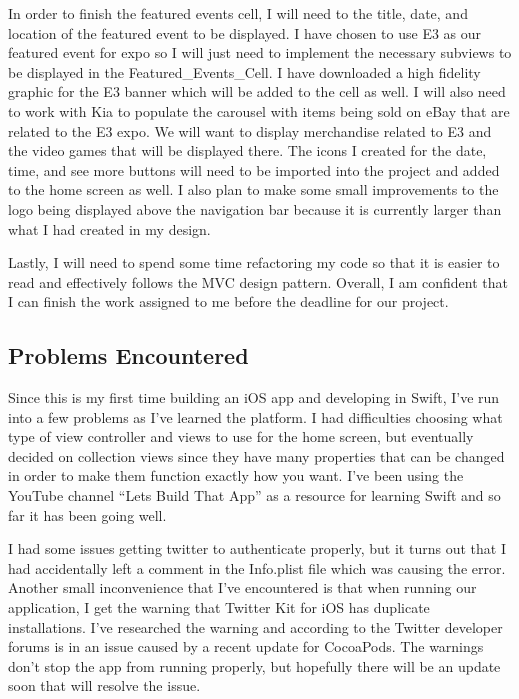\documentclass[onecolumn, draftclsnofoot,10pt, compsoc]{IEEEtran}
\begin{document}
\noindent In order to finish the featured events cell, I will need to the title, date, and location of the featured event to be displayed. I have chosen to use E3 as our featured event for expo so I will just need to implement the necessary subviews to be displayed in the Featured\_Events\_Cell. I have downloaded a high fidelity graphic for the E3 banner which will be added to the cell as well. I will also need to work with Kia to populate the carousel with items being sold on eBay that are related to the E3 expo. We will want to display merchandise related to E3 and the video games that will be displayed there. The icons I created for the date, time, and see more buttons will need to be imported into the project and added to the home screen as well. I also plan to make some small improvements to the logo being displayed above the navigation bar because it is currently larger than what I had created in my design. \newline

\noindent Lastly, I will need to spend some time refactoring my code so that it is easier to read and effectively follows the MVC design pattern. Overall, I am confident that I can finish the work assigned to me before the deadline for our project.

\subsection{Problems Encountered}
Since this is my first time building an iOS app and developing in Swift, I’ve run into a few problems as I’ve learned the platform. I had difficulties choosing what type of view controller and views to use for the home screen, but eventually decided on collection views since they have many properties that can be changed in order to make them function exactly how you want. I’ve been using the YouTube channel “Lets Build That App” as a resource for learning Swift and so far it has been going well. \newline

\noindent I had some issues getting twitter to authenticate properly, but it turns out that I had accidentally left a comment in the Info.plist file which was causing the error. Another small inconvenience that I’ve encountered is that when running our application, I get the warning that Twitter Kit for iOS has duplicate installations. I’ve researched the warning and according to the Twitter developer forums is in an issue caused by a recent update for CocoaPods. The warnings don’t stop the app from running properly, but hopefully there will be an update soon that will resolve the issue. \newline
\end{document}

